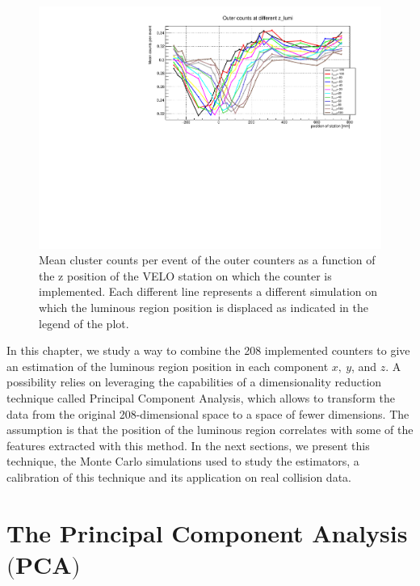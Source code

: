 \begin{figure}
    \centering
    \includegraphics[width=\textwidth]{figures/z_lumi_dependency.pdf}
    \caption{Mean cluster counts per event of the outer counters as a function of the z position of the VELO station on which the counter is implemented. Each different line represents a different simulation on which the luminous region position is displaced as indicated in the legend of the plot.}
    \label{fig:z_lumi_dependency}
\end{figure}

In this chapter, we study a way to combine the 208 implemented counters to give an estimation of the luminous region position in each component $x,\ y$, and $z$. A possibility relies on leveraging the capabilities of a dimensionality reduction technique called Principal Component Analysis, which allows to transform the data from the original 208-dimensional space to a space of fewer dimensions. The assumption is that the position of the luminous region correlates with some of the features extracted with this method. In the next sections, we present this technique, the Monte Carlo simulations used to study the estimators, a calibration of this technique and its application on real collision data.



\section[The Principal Component Analysis]{The Principal Component Analysis $\bigl($PCA$\bigr)$}\label{sec:PCA}

